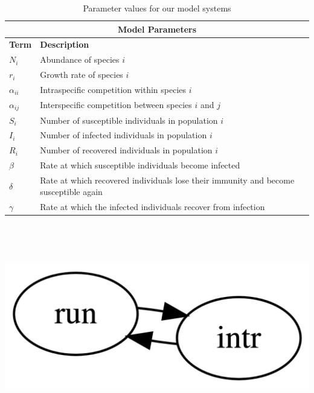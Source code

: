 \documentclass[
  letterpaper,
  DIV=11,
  numbers=noendperiod]{scrartcl}
\begin{document}
\begin{table}[hpt]
\centering
\begin{tabular}{ |m{3cm}||m{10cm}|}
     \hline
     \multicolumn{2}{|c|}{Model Parameters} \\
     \hline
     \textbf{Term} & \textbf{Description} \\
     \hline
     $N_i$ & Abundance of species $i$ \\
     $r_i$ & Growth rate of species $i$ \\
     $\alpha_{ii}$ & Intraspecific competition within species $i$ \\
     $\alpha_{ij}$ & Interspecific competition between species $i$ and $j$ \\
     $S_i$ & Number of susceptible individuals in population $i$ \\
     $I_i$ & Number of infected individuals in population $i$ \\
     $R_i$ & Number of recovered individuals in population $i$ \\
     $\beta$ & Rate at which susceptible individuals become infected \\
     $\delta$ & Rate at which recovered individuals lose their immunity and become susceptible again \\
     $\gamma$ & Rate at which the infected individuals recover from infection \\
     \hline
\end{tabular}
\caption{Parameter values for our model systems}
\label{table:parameters}
\end{table}

\includegraphics[width=5.5in,height=3.5in]{index_files/figure-latex/dot-figure-1.png}
\end{document}
